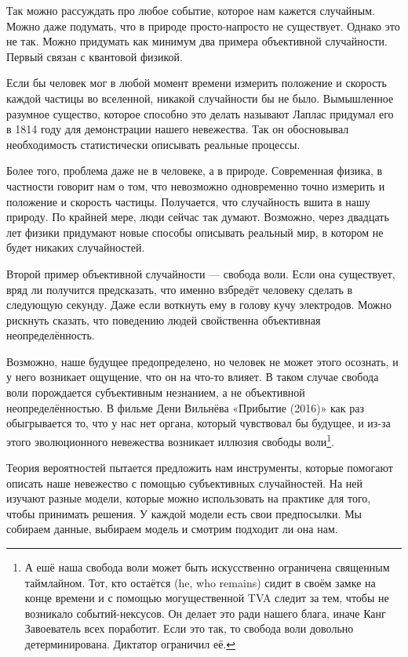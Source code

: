 \documentclass[12pt, a4paper, oneside]{article}
\begin{document}
Так можно рассуждать про любое событие, которое нам кажется случайным. Можно даже подумать, что  в природе просто-напросто не существует. Однако это не так. Можно придумать как минимум два примера объективной случайности. Первый связан с квантовой физикой. 

Если бы человек мог в любой момент времени измерить положение и скорость каждой частицы во вселенной, никакой случайности бы не было. Вымышленное разумное существо, которое способно это делать называют  Лаплас придумал его в 1814 году для демонстрации нашего невежества. Так он обосновывал необходимость статистически описывать реальные процессы. 

Более того, проблема даже не в человеке, а в природе. Современная физика, в частности  говорит нам о том, что невозможно одновременно точно измерить и положение и скорость частицы. Получается, что случайность вшита в нашу природу. По крайней мере, люди сейчас так думают. Возможно, через двадцать лет физики придумают новые способы описывать реальный мир, в котором не будет никаких случайностей. 

Второй пример объективной случайности --- свобода воли. Если она существует, вряд ли получится предсказать, что именно взбредёт человеку сделать в следующую секунду. Даже если воткнуть ему в голову кучу электродов. Можно рискнуть сказать, что поведению людей свойственна объективная неопределённость.

Возможно, наше будущее предопределено, но человек не может этого осознать, и у него возникает ощущение, что он на что-то влияет. В таком случае свобода воли порождается субъективным незнанием, а не объективной неопределённостью. В фильме Дени Вильнёва «Прибытие (2016)» как раз обыгрывается то, что у нас нет органа, который чувствовал бы будущее, и из-за этого эволюционного невежества возникает иллюзия свободы воли\footnote{А ешё наша свобода воли может быть искусственно ограничена священным таймлайном. Тот, кто остаётся (he, who remains) сидит в своём замке на конце времени и с помощью могущественной TVA следит за тем, чтобы не возникало событий-нексусов. Он делает это ради нашего блага, иначе Канг Завоеватель всех поработит. Если это так, то свобода воли довольно детерминирована. Диктатор ограничил её.}.

Теория вероятностей пытается предложить нам инструменты, которые помогают описать наше невежество с помощью субъективных случайностей. На ней изучают разные модели, которые можно использовать на практике для того, чтобы принимать решения. У каждой модели есть свои предпосылки. Мы собираем данные, выбираем модель и смотрим подходит ли она нам. 
\end{document}
